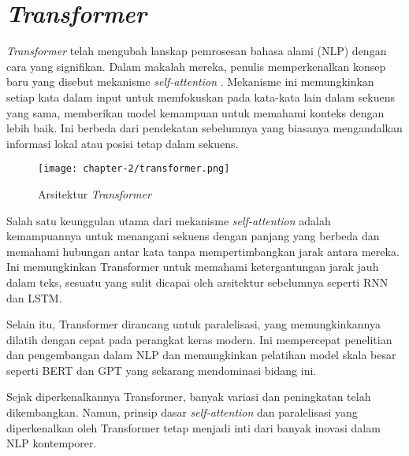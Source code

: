 \section{\textit{Transformer}}

\textit{Transformer} telah mengubah lanskap pemrosesan bahasa alami (NLP) dengan cara yang signifikan. Dalam makalah mereka, penulis memperkenalkan konsep baru yang disebut mekanisme \textit{self-attention} \parencite{transformers}. Mekanisme ini memungkinkan setiap kata dalam input untuk memfokuskan pada kata-kata lain dalam sekuens yang sama, memberikan model kemampuan untuk memahami konteks dengan lebih baik. Ini berbeda dari pendekatan sebelumnya yang biasanya mengandalkan informasi lokal atau posisi tetap dalam sekuens.

\begin{figure}[ht]
    \centering
    \texttt{[image: chapter-2/transformer.png]}
    \caption{Arsitektur \textit{Transformer}}
    \label{fig:transformer}
\end{figure}

Salah satu keunggulan utama dari mekanisme \textit{self-attention} adalah kemampuannya untuk menangani sekuens dengan panjang yang berbeda dan memahami hubungan antar kata tanpa mempertimbangkan jarak antara mereka. Ini memungkinkan Transformer untuk memahami ketergantungan jarak jauh dalam teks, sesuatu yang sulit dicapai oleh arsitektur sebelumnya seperti RNN dan LSTM.

Selain itu, Transformer dirancang untuk paralelisasi, yang memungkinkannya dilatih dengan cepat pada perangkat keras modern. Ini mempercepat penelitian dan pengembangan dalam NLP dan memungkinkan pelatihan model skala besar seperti BERT dan GPT yang sekarang mendominasi bidang ini.

Sejak diperkenalkannya Transformer, banyak variasi dan peningkatan telah dikembangkan. Namun, prinsip dasar \textit{self-attention} dan paralelisasi yang diperkenalkan oleh Transformer tetap menjadi inti dari banyak inovasi dalam NLP kontemporer.